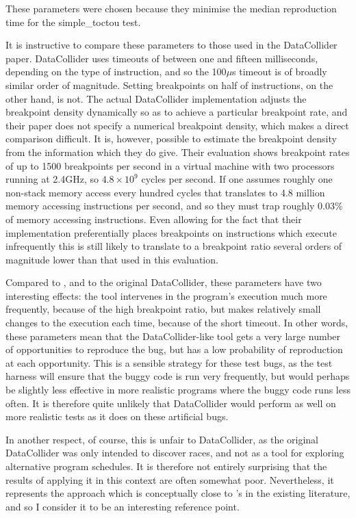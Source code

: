 These parameters were chosen because they minimise the median
reproduction time for the simple\_toctou test.

It is instructive to compare these parameters to those used in the
DataCollider paper.  DataCollider uses timeouts of between one and
fifteen milliseconds, depending on the type of instruction, and so the
100$\mu$s timeout is of broadly similar order of magnitude.  Setting
breakpoints on half of instructions, on the other hand, is not.  The
actual DataCollider implementation adjusts the breakpoint density
dynamically so as to achieve a particular breakpoint rate, and their
paper does not specify a numerical breakpoint density, which makes a
direct comparison difficult.  It is, however, possible to estimate the
breakpoint density from the information which they do give.  Their
evaluation shows breakpoint rates of up to 1500 breakpoints per second
in a virtual machine with two processors running at 2.4GHz, so $4.8
\times 10^9$ cycles per second.  If one assumes roughly one non-stack
memory access every hundred cycles that translates to 4.8 million
memory accessing instructions per second, and so they must trap
roughly 0.03\% of memory accessing instructions.  Even allowing for
the fact that their implementation preferentially places breakpoints
on instructions which execute infrequently this is still likely to
translate to a breakpoint ratio several orders of magnitude lower than
that used in this evaluation.

Compared to {\technique}, and to the original DataCollider, these
parameters have two interesting effects: the tool intervenes in the
program's execution much more frequently, because of the high
breakpoint ratio, but makes relatively small changes to the execution
each time, because of the short timeout.  In other words, these
parameters mean that the DataCollider-like tool gets a very large
number of opportunities to reproduce the bug, but has a low
probability of reproduction at each opportunity.  This is a sensible
strategy for these test bugs, as the test harness will ensure that the
buggy code is run very frequently, but would perhaps be slightly less
effective in more realistic programs where the buggy code runs less
often.  It is therefore quite unlikely that DataCollider would perform
as well on more realistic tests as it does on these artificial bugs.

In another respect, of course, this is unfair to DataCollider, as the
original DataCollider was only intended to discover races, and not as
a tool for exploring alternative program schedules.  It is therefore
not entirely surprising that the results of applying it in this
context are often somewhat poor.  Nevertheless, it represents the
approach which is conceptually close to {\technique}'s in the existing
literature, and so I consider it to be an interesting reference
point.

